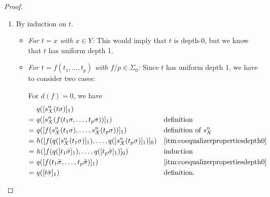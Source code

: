 \documentclass[a4paper,UKenglish,cleveref,thm-restate,numberwithinsect,final]{lipics-v2021}
\newcommand{\sigp}{\Sigma_0}
\theoremstyle{plain}
\numberwithin{equation}{section}
\newcommand{\+}[1]{\mathcal{#1}\xspace}
\theoremstyle{definition}
\begin{document}
\begin{proof}
\begin{enumerate}[wide]
\begin{itemize}
\begin{align*}
                    \end{align*}
                    where $(\star)$ follows from $(Q, h)$ being an $M_0$-algebra.
                \item
                    \textit{For \(t = a.f(t_1, \ldots, t_p)\) and \(t = \nu a.f(t_1, \ldots, t_p)\):}
                    Analogous to the previous case.
            \end{itemize}
        \item
            By induction on \(t\).
            \begin{itemize}
                \item
                    \textit{For \(t = x\) with \(x \in Y\):}
                    This would imply that \(t\) is depth-0, but we know that \(t\) has uniform depth 1.
                \item
                    \textit{For \(t = f(t_1, \ldots, t_p)\) with \(f/p \in \sigp\):}
                    Since \(t\) has uniform depth 1, we have to consider two cases:

                    For \(d(f) = 0\), we have
                    \begin{align*}
                        &q([s^n_X(t\sigma)]_1) \\
                        =~&q([s^n_X(f(t_1\sigma, \ldots, t_p\sigma))]_1) && \text{definition} \\
                        =~&q([f(s^n_X(t_1\sigma), \ldots, s^n_X(t_p\sigma))]_1) && \text{definition of } s^n_X \\
                        =~&h([f(q([s^n_X(t_1\sigma)]_1), \ldots, q([s^n_X(t_p\sigma)]_1)]_0) && \text{\eqref{itm:coequalizerpropertiesdepth0}} \\
                        =~&h([f(q([t_1\bar{\sigma}]_1), \ldots, q([t_p\bar{\sigma}]_1)]_0) && \text{induction} \\
                        =~&q([f(t_1\bar{\sigma}, \ldots, t_p\bar{\sigma})]_1) && \text{\eqref{itm:coequalizerpropertiesdepth0}} \\
                        =~&q([t\bar{\sigma}]_1) && \text{definition}.
                    \end{align*}


\end{itemize}
\end{enumerate}
\end{proof}
\end{document}
